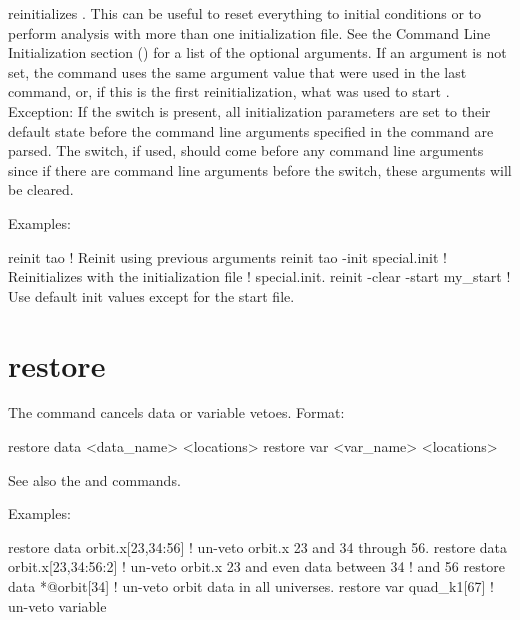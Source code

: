  reinitializes \tao. This can be useful to reset everything to initial
conditions or to perform analysis with more than one initialization file. See the Command Line
Initialization section () for a list of the optional arguments. If an argument
is not set, the  command uses the same argument value that were used in the last
 command, or, if this is the first reinitialization, what was used to start \tao.
Exception: If the  switch is present, all initialization parameters are set to their
default state before the command line arguments specified in the  command are
parsed. The  switch, if used, should come before any command line arguments since if
there are command line arguments before the  switch, these arguments will be cleared.

Examples:
\begin{example}
  reinit tao                         ! Reinit using previous arguments
  reinit tao -init special.init      ! Reinitializes \tao with the initialization file 
                                     !   special.init.
  reinit -clear -start my_start      ! Use default init values except for the start file.                    
\end{example}

\section{restore}
\label{s:restore}

The  command cancels data or variable vetoes. Format:
\begin{example}
  restore data  <data_name> <locations>
  restore var <var_name> <locations>
\end{example}

\vskip 10pt 

See also the  and  commands.

Examples:
\begin{example}
  restore data orbit.x[23,34:56]   ! un-veto orbit.x 23 and 34 through 56.
  restore data orbit.x[23,34:56:2] ! un-veto orbit.x 23 and even data between 34 
                                   !                                          and 56
  restore data *@orbit[34]         ! un-veto orbit data in all universes.
  restore var quad_k1[67]          ! un-veto variable
\end{example}

